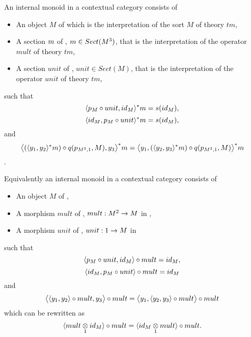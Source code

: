 \begin{lemma}
\label{internalmonoidlemma}
An internal monoid in a contextual category \catcw consists of
\begin{itemize}
\item An object $M$ of \catcw which is the interpretation of the sort $M$ of theory $tm$,
\item A section $m$ of \catc, $m \in Sect(M^3)$, that is the interpretation of the operator $mult$ of theory $tm$,
\item A section $unit$ of \catc, $unit \in Sect(M)$, that is the interpretation of the operator $unit$ of theory $tm$,
\end{itemize}
such that
\begin{equation}
\label{internalmonoidrepresentation1axiom1}
\tuple{p_M \circ unit,id_M}^*\fmult=s(id_M),
\end{equation}
\begin{equation}
\label{internalmonoidrepresentation1axiom2}
\tuple{id_M,p_M \circ unit}^*\fmult=s(id_M),
\end{equation}
and
\begin{equation}
\label{internalmonoidrepresentation1axiom3}
\bigtuple{(\tuple{y_1,y_2}^*\fmult)\circ q(p_{M^3,1},M),y_3}^*\fmult
=\bigtuple{y_1,(\tuple{y_2,y_3}^*\fmult)\circ q(p_{M^3,1},M)}^*\fmult
\end{equation}.

Equivalently an internal monoid in a contextual category \catc consists of
\begin{itemize}
\item An object $M$ of \catc,
\item A morphism $mult$ of \catc, $mult: M^2 \rightarrow M$ in \catc,
\item A morphism $unit$ of \catc, $unit: 1 \rightarrow M$ in \catc
\end{itemize}
such that
\begin{equation}
\label{internalmonoidrepresentation2axiom1}
\tuple{p_M \circ unit,id_M}\circ mult=id_M,
\end{equation}
\begin{equation}
\label{internalmonoidrepresentation2axiom2}
\tuple{{id_M,p_M \circ unit}}\circ mult=id_M
\end{equation}
and
\begin{equation}
\label{internalmonoidrepresentation2axiom3}
\bigtuple{\tuple{y_1,y_2}\circ mult,y_3}\circ mult
=\bigtuple{y_1,\tuple{y_2,y_3} \circ mult}\circ mult
\end{equation}
which can be rewritten as 
\begin{equation}
\label{internalmonoidrepresentation2axiom3rewritten}
\tuple{\crossx{mult}{id_M}{1}}\circ mult = \tuple{\crossx{id_M}{mult}{1}}\circ mult.
\end{equation}
\end{lemma}
